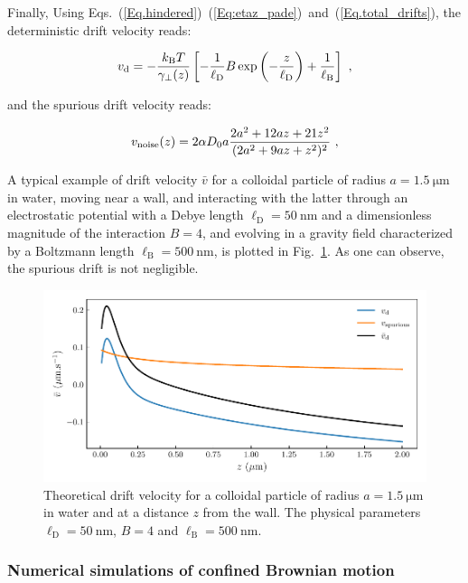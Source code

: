 Finally, Using  Eqs.~(\ref{Eq.hindered})~(\ref{Eq:etaz_pade})~and~(\ref{Eq.total_drifts}), the deterministic drift velocity reads:

\begin{equation}
	v_\textnormal{d} =- \frac{k_\mathrm{B}T}{\gamma_\bot(z)} \left[- \frac{1}{\ell_\mathrm{D}} B \exp \left(- \frac{z}{\ell_\mathrm{D}}\right) + \frac{1}{\ell_\mathrm{B}}\right] ~,
\end{equation}

and the spurious drift velocity reads:

\begin{equation}
	v_\textnormal{noise} (z)= 2 \alpha D_0 a\frac{2a^2 + 12 az + 21 z^2}{(2 a^2 + 9az + z^2) ^2} ~,
	\label{Eq.spurious_drift}
\end{equation}

A typical example of drift velocity $\bar{v}$ for a colloidal particle of radius $a = 1.5 ~\mathrm{\mu m}$ in water, moving near a wall, and interacting with the latter through an electrostatic potential with a Debye length $\ell_\mathrm{D} = 50 ~ \mathrm{nm}$ and a dimensionless magnitude of the interaction $B = 4$, and evolving in a gravity field characterized by a Boltzmann length $\ell_\mathrm{B} = 500 ~ \mathrm{nm}$, is plotted in Fig.~\ref{fig.spurious}. As one can observe, the spurious drift is not negligible.

\begin{figure}[ht]
	\centering
	\includegraphics{02_body/chapter3/images/spurious_drift/spurious.pdf}
	\caption{Theoretical drift velocity for a colloidal particle of radius $a = 1.5 ~\mathrm{\mu m}$ in water and at a distance $z$ from the wall. The physical parameters $\ell_\mathrm{D} = 50 ~ \mathrm{nm}$, $B = 4 $ and $\ell_\mathrm{B} = 500 ~ \mathrm{nm}$.} 
	\label{fig.spurious}
\end{figure}


\subsubsection{Numerical simulations of confined Brownian motion}

